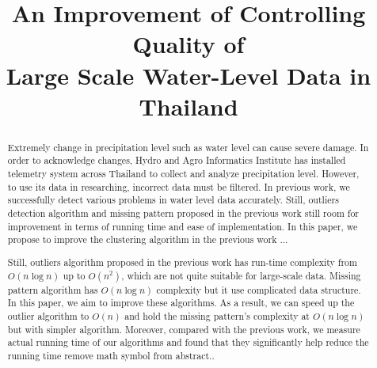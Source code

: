 \documentclass[conference]{IEEEtran}
\begin{document}
\title{An Improvement of Controlling Quality of \\Large Scale Water-Level Data in Thailand}

\author{
\and
{}
}

\maketitle


\begin{abstract}
Extremely change in precipitation level such as water level can cause severe damage. In order to acknowledge changes, Hydro and Agro Informatics Institute has installed telemetry system across Thailand to collect and analyze precipitation level. However, to use its data in researching, incorrect data must be filtered. In previous work, we successfully detect various problems in water level data accurately. Still, outliers detection algorithm  and missing pattern proposed in the previous work still room for improvement in terms of running time and ease of implementation. In this paper, we propose to improve the clustering algorithm in the previous work ...

Still, outliers algorithm proposed in the previous work has  run-time complexity from $O(n\log{n})$ up to $O(n^2)$, which are not quite suitable for large-scale data. Missing pattern algorithm has $O(n\log{n})$ complexity but it use complicated data structure. In this paper, we aim to improve these algorithms. As a result, we can speed up the outlier algorithm to $O(n)$ and hold the missing pattern's complexity at $O(n \log{n})$ but with simpler algorithm. Moreover, compared with the previous work, we measure actual running time of our algorithms and found that they significantly help reduce the running time {\color{red} remove math symbol from abstract.}.

\end{abstract}
\end{document}
